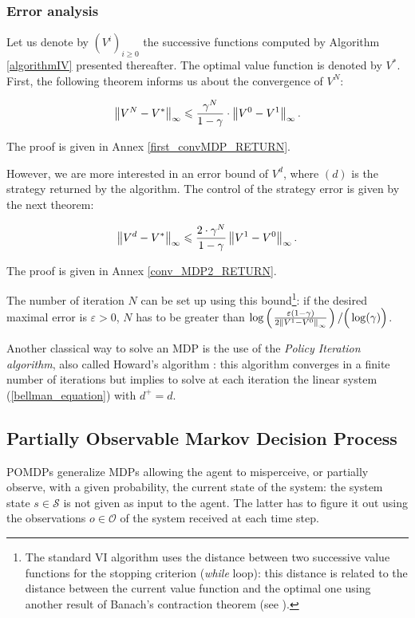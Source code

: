 \subsubsection{Error analysis}
\label{section_error_analysis}
Let us denote by $(V^i)_{i \geqslant 0}$ the successive
functions computed by Algorithm \ref{algorithmIV}
presented thereafter.
The optimal value function is denoted by $V^*$.
First, the following theorem informs us about the convergence of $V^N$:
\begin{theorem}
\label{first_convMDP}
\begin{equation} 
\label{conv_mdp_1}
\left\lVert V^N -V^* \right\rVert_{\infty} \leqslant \frac{\gamma^N}{1-\gamma} \cdot \left\lVert  V^{0} - V^{1}  \right\rVert_{\infty}. 
\end{equation}
\end{theorem}
The proof is given in Annex \ref{first_convMDP_RETURN}.

However, we are more interested in an error bound of $V^{d}$,
where $(d)$ is the strategy returned by the algorithm.
The control of the strategy error is given by the next theorem:
\begin{theorem}
\label{conv_MDP2}
\[ \left\lVert  V^d - V^*  \right\rVert_{\infty} \leqslant \frac{2 \cdot \gamma^N}{1-\gamma} \left\lVert  V^1 - V^0  \right\rVert_{\infty}. \]
\end{theorem}
The proof is given in Annex \ref{conv_MDP2_RETURN}.

The number of iteration $N$
can be set up using this bound\footnote{The standard VI algorithm uses the distance between two
successive value functions for the stopping criterion (\textit{while} loop):
this distance is related to the distance between the current value function 
and the optimal one
using another result of Banach's contraction theorem (see \cite{puterman94}). }:
if the desired maximal error is $\varepsilon>0$,
$N$ has to be greater than 
$\log \left( \left.  \frac{ \varepsilon(1-\gamma)}{2\left\lVert V^1-V^0 \right\rVert_{\infty}} \right. \right)/\Big(\log(\gamma)\Big)$.

Another classical way to solve an MDP is the use of the
\textit{Policy Iteration algorithm},
also called Howard's algorithm \cite{puterman94}:
this algorithm converges in a finite number of iterations
but implies to solve at each iteration the linear system 
(\ref{bellman_equation}) with $d^+ = d$.

\subsection{Partially Observable Markov Decision Process} \label{section_POMDP}
POMDPs generalize MDPs
allowing the agent to misperceive, or partially observe,
with a given probability, 
the current state of the system: 
the system state $s \in \mathcal{S}$ is not given as input
to the agent.
The latter has to figure it out using
the observations $o \in \mathcal{O}$ of the system 
received at each time step.
